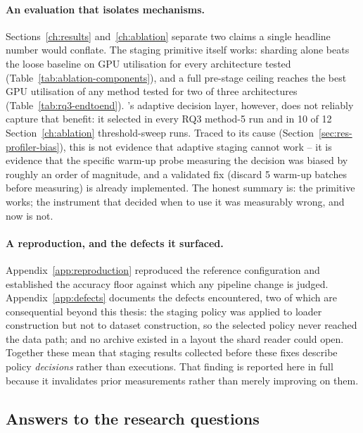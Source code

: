 \paragraph{An evaluation that isolates mechanisms.}
Sections~\ref{ch:results} and~\ref{ch:ablation} separate two claims a single
headline number would conflate. The staging primitive itself works: sharding
alone beats the loose baseline on GPU utilisation for every architecture tested
(Table~\ref{tab:ablation-components}), and a full pre-stage ceiling reaches the
best GPU utilisation of any method tested for two of three architectures
(Table~\ref{tab:rq3-endtoend}). \pads{}'s adaptive decision layer, however, does
not reliably capture that benefit: it selected  in every RQ3
method-5 run and in 10 of 12 Section~\ref{ch:ablation} threshold-sweep runs.
Traced to its cause (Section~\ref{sec:res-profiler-bias}), this is not evidence
that adaptive staging cannot work -- it is evidence that the specific warm-up
probe measuring the decision was biased by roughly an order of magnitude, and a
validated fix (discard 5 warm-up batches before measuring) is already
implemented. The honest summary is: the primitive works; the instrument that
decided when to use it was measurably wrong, and now is not.

\paragraph{A reproduction, and the defects it surfaced.}
Appendix~\ref{app:reproduction} reproduced the reference configuration and
established the accuracy floor against which any pipeline change is judged.
Appendix~\ref{app:defects} documents the defects encountered, two of which are
consequential beyond this thesis: the staging policy was applied to loader
construction but not to dataset construction, so the selected policy never reached
the data path; and no archive existed in a layout the shard reader could open.
Together these mean that staging results collected before these fixes describe
policy \emph{decisions} rather than executions.
That finding is reported here in full because it invalidates prior measurements
rather than merely improving on them.

\subsection{Answers to the research questions}

